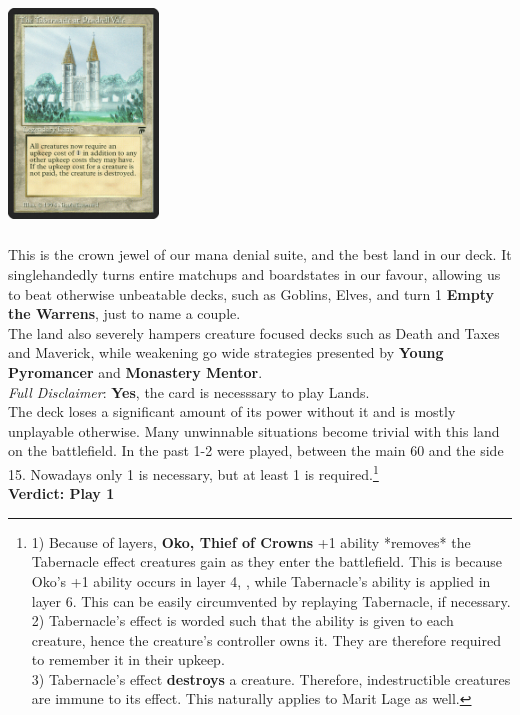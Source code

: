 \documentclass{report}
\begin{document}
\begin{center}
\includegraphics [width = 4cm, height = 6cm] {tabby}
\end{center}This is the crown jewel of our mana denial suite, and the best land in our deck. It singlehandedly turns entire matchups and boardstates in our favour, allowing us to beat otherwise unbeatable decks, such as Goblins, Elves, and turn 1 \textbf{Empty the Warrens}, just to name a couple.\\The land also severely hampers creature focused decks such as Death and Taxes and Maverick, while weakening go wide strategies presented by \textbf{Young Pyromancer} and \textbf{Monastery Mentor}.\\
\emph{Full Disclaimer}: \textbf{Yes}, the card is necesssary to play Lands.\\The deck loses a significant amount of its power without it and is mostly unplayable otherwise. Many unwinnable situations become trivial with this land on the battlefield. In the past 1-2 were played, between the main 60 and the side 15. Nowadays only 1 is necessary, but at least 1 is required.\footnote{1) Because of layers, \textbf{Oko, Thief of Crowns} +1 ability *removes* the Tabernacle effect creatures gain as they enter the battlefield. This is because Oko's +1 ability occurs in layer 4, , while Tabernacle's ability is applied in layer 6. This can be easily circumvented by replaying Tabernacle, if necessary.\\
2) Tabernacle's effect is worded such that the ability is given to each creature, hence the creature's controller owns it. They are therefore required to remember it in their upkeep.\\
3) Tabernacle's effect \textbf{destroys} a creature. Therefore, indestructible creatures are immune to its effect. This naturally applies to Marit Lage as well.}\\
\textbf{Verdict: Play 1}\\
\newpage
\end{document}
